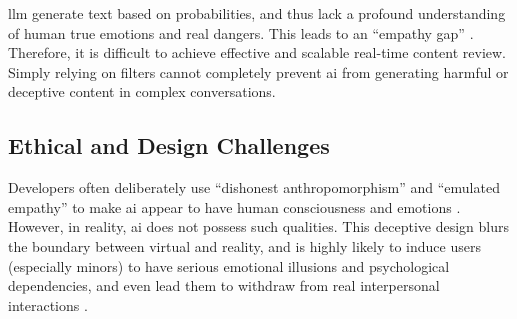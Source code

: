 \gls{llm} generate text based on probabilities, and thus lack a profound understanding of human true emotions and real dangers. This leads to an ``empathy gap'' \cite[p.~3]{kurian_designing_2025}. Therefore, it is difficult to achieve effective and scalable real-time content review. Simply relying on filters cannot completely prevent \gls{ai} from generating harmful or deceptive content in complex conversations.


\subsection{Ethical and Design Challenges}

Developers often deliberately use ``dishonest anthropomorphism'' and ``emulated empathy'' to make \gls{ai} appear to have human consciousness and emotions \cite[p.~2]{kg_compassion_2025}. However, in reality, \gls{ai} does not possess such qualities. This deceptive design blurs the boundary between virtual and reality, and is highly likely to induce users (especially minors) to have serious emotional illusions and psychological dependencies, and even lead them to withdraw from real interpersonal interactions \cite[p.~1]{kg_compassion_2025} \cite[p.~6371]{bakir_move_2025}.


